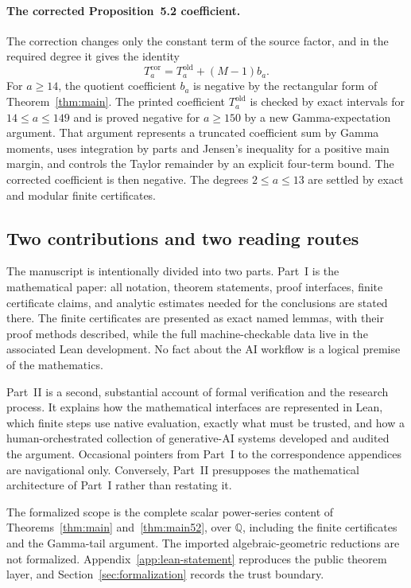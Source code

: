\documentclass[11pt]{article}
\theoremstyle{definition}
\theoremstyle{remark}
\newcommand{\Q}{\mathbb Q}
\begin{document}
\paragraph{The corrected Proposition~5.2 coefficient.}
The correction changes only the constant term of the source factor, and in the
required degree it gives the identity
\[
  T_a^{\mathrm{cor}}=T_a^{\mathrm{old}}+(M-1)b_a.
\]
For $a\ge14$, the quotient coefficient $b_a$ is negative by the rectangular
form of Theorem~\ref{thm:main}.  The printed coefficient
$T_a^{\mathrm{old}}$ is checked by exact intervals for $14\le a\le149$ and is
proved negative for $a\ge150$ by a new Gamma-expectation argument.  That
argument represents a truncated coefficient sum by Gamma moments, uses
integration by parts and Jensen's inequality for a positive main margin, and
controls the Taylor remainder by an explicit four-term bound.  The corrected
coefficient is then negative.  The degrees $2\le a\le13$ are settled by exact
and modular finite certificates.

\subsection{Two contributions and two reading routes}

The manuscript is intentionally divided into two parts.  Part~I is the
mathematical paper: all notation, theorem statements, proof interfaces, finite
certificate claims, and analytic estimates needed for the conclusions are
stated there.  The finite certificates are presented as exact named lemmas,
with their proof methods described, while the full machine-checkable data live
in the associated Lean development.  No fact about the AI workflow is a
logical premise of the mathematics.

Part~II is a second, substantial account of formal verification and the
research process.  It
explains how the mathematical interfaces are represented in Lean, which finite
steps use native evaluation, exactly what must be trusted, and how a
human-orchestrated collection of generative-AI systems developed and audited
the argument.  Occasional pointers from Part~I to the correspondence appendices
are navigational only.  Conversely, Part~II presupposes the mathematical
architecture of Part~I rather than restating it.

The formalized scope is the complete scalar power-series content of
Theorems~\ref{thm:main} and~\ref{thm:main52}, over $\Q$, including the finite
certificates and the Gamma-tail argument.  The imported algebraic-geometric
reductions are not formalized.  Appendix~\ref{app:lean-statement} reproduces
the public theorem layer, and Section~\ref{sec:formalization} records the trust
boundary.
\end{document}
